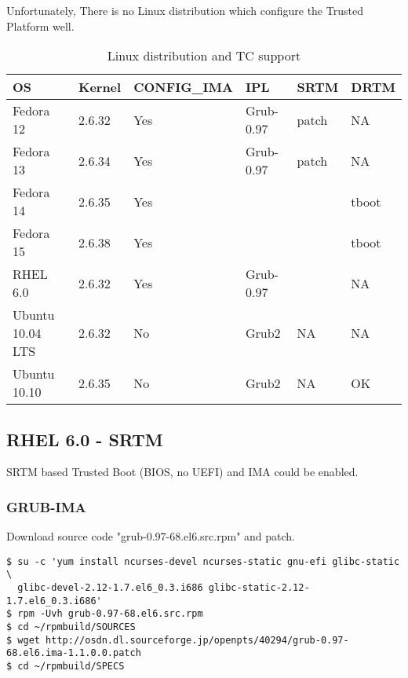 Unfortunately, There is no Linux distribution which configure the Trusted Platform well.


\begin{table}[h]
\caption{Linux distribution and TC support}
\label{table:ptsc:file}
\begin{center}
\begin{tabular}{llllll}
        \hline
        OS        & Kernel & CONFIG\_IMA & IPL & SRTM & DRTM \\
        \hline  \hline
        Fedora 12        & 2.6.32 & Yes & Grub-0.97 & patch & NA \\
        \hline
        Fedora 13        & 2.6.34 & Yes & Grub-0.97 & patch & NA \\
        \hline
        Fedora 14        & 2.6.35 & Yes &      &       & tboot \\
        \hline
        Fedora 15        & 2.6.38 & Yes &      &       & tboot \\
        \hline
        RHEL 6.0         & 2.6.32 & Yes & Grub-0.97 &  & NA \\
        \hline
        Ubuntu 10.04 LTS & 2.6.32 & No  & Grub2 & NA & NA \\
        \hline
        Ubuntu 10.10     & 2.6.35 & No  & Grub2 & NA & OK \\
        \hline
\end{tabular}
\end{center}
\end{table}

\subsection{RHEL 6.0 - SRTM}

SRTM based Trusted Boot (BIOS, no UEFI) and IMA could be enabled.

\subsubsection{GRUB-IMA} 

Download source code "grub-0.97-68.el6.src.rpm" and patch.

\begin{lstlisting}[style=console, linewidth = 170mm]
$ su -c 'yum install ncurses-devel ncurses-static gnu-efi glibc-static \
  glibc-devel-2.12-1.7.el6_0.3.i686 glibc-static-2.12-1.7.el6_0.3.i686'
$ rpm -Uvh grub-0.97-68.el6.src.rpm
$ cd ~/rpmbuild/SOURCES
$ wget http://osdn.dl.sourceforge.jp/openpts/40294/grub-0.97-68.el6.ima-1.1.0.0.patch
$ cd ~/rpmbuild/SPECS
\end{lstlisting}

